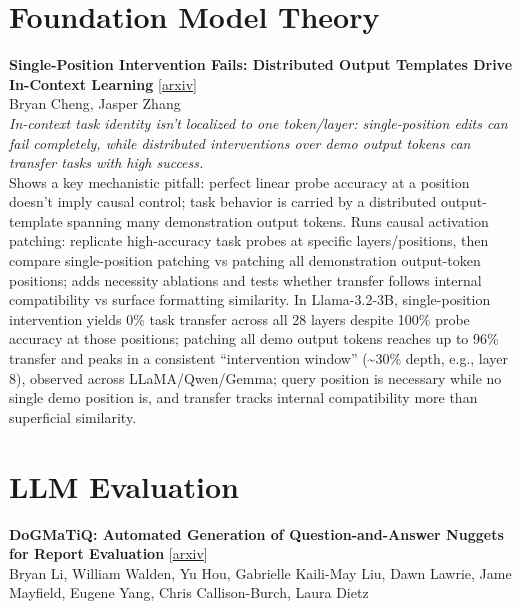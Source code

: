 \documentclass[12pt,letterpaper]{article}
\begin{document}
\medskip


\section*{Foundation Model Theory}

{\small\textbf{Single-Position Intervention Fails: Distributed Output Templates Drive In-Context Learning}} {\scriptsize[\href{https://arxiv.org/abs/2605.04061}{arxiv}]}\\
{\scriptsize Bryan Cheng, Jasper Zhang}\\

{\small\textit{In-context task identity isn't localized to one token/layer: single-position edits can fail completely, while distributed interventions over demo output tokens can transfer tasks with high success.}}\\[1pt]
{\footnotesize Shows a key mechanistic pitfall: perfect linear probe accuracy at a position doesn't imply causal control; task behavior is carried by a distributed output-template spanning many demonstration output tokens. Runs causal activation patching: replicate high-accuracy task probes at specific layers/positions, then compare single-position patching vs patching all demonstration output-token positions; adds necessity ablations and tests whether transfer follows internal compatibility vs surface formatting similarity. In Llama-3.2-3B, single-position intervention yields 0\% task transfer across all 28 layers despite 100\% probe accuracy at those positions; patching all demo output tokens reaches up to 96\% transfer and peaks in a consistent ``intervention window'' (\textasciitilde{}30\% depth, e.g., layer 8), observed across LLaMA/Qwen/Gemma; query position is necessary while no single demo position is, and transfer tracks internal compatibility more than superficial similarity.}

\medskip


\section*{LLM Evaluation}

{\small\textbf{DoGMaTiQ: Automated Generation of Question-and-Answer Nuggets for Report Evaluation}} {\scriptsize[\href{https://arxiv.org/abs/2605.04458}{arxiv}]}\\
{\scriptsize Bryan Li, William Walden, Yu Hou, Gabrielle Kaili-May Liu, Dawn Lawrie, Jame Mayfield, Eugene Yang, Chris Callison-Burch, Laura Dietz}\\
\end{document}
